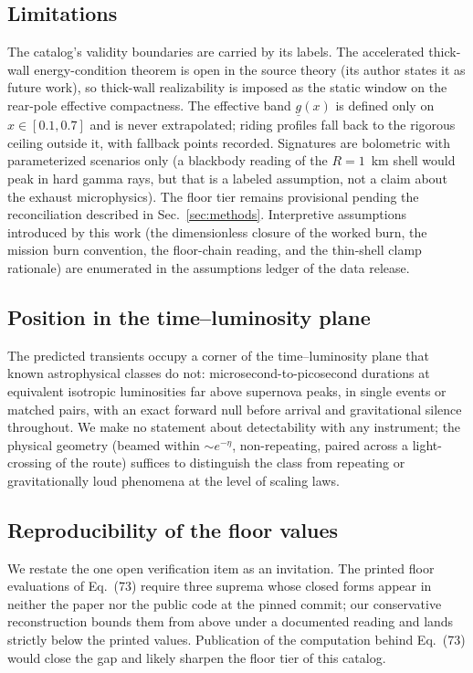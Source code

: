 \documentclass[11pt]{article}
\begin{document}
\subsection{Limitations}

The catalog's validity boundaries are carried by its labels. The
accelerated thick-wall energy-condition theorem is open in the source
theory (its author states it as future work), so thick-wall realizability
is imposed as the static window on the rear-pole effective compactness.
The effective band $\underline{g}(x)$ is defined only on $x \in [0.1,
0.7]$ and is never extrapolated; riding profiles fall back to the rigorous
ceiling outside it, with fallback points recorded. Signatures are
bolometric with parameterized scenarios only (a blackbody reading of the
$R = 1$~km shell would peak in hard gamma rays, but that is a labeled
assumption, not a claim about the exhaust microphysics). The floor tier
remains provisional pending the reconciliation described in
Sec.~\ref{sec:methods}. Interpretive assumptions introduced by this work
(the dimensionless closure of the worked burn, the mission burn
convention, the floor-chain reading, and the thin-shell clamp rationale)
are enumerated in the assumptions ledger of the data release.

\subsection{Position in the time--luminosity plane}

The predicted transients occupy a corner of the time--luminosity plane
that known astrophysical classes do not: microsecond-to-picosecond
durations at equivalent isotropic luminosities far above supernova peaks,
in single events or matched pairs, with an exact forward null before
arrival and gravitational silence throughout. We make no statement about
detectability with any instrument; the physical geometry (beamed within
$\sim e^{-\eta}$, non-repeating, paired across a light-crossing of the
route) suffices to distinguish the class from repeating or
gravitationally loud phenomena at the level of scaling laws.

\subsection{Reproducibility of the floor values}

We restate the one open verification item as an invitation. The printed
floor evaluations of Eq.~(73) require three suprema whose closed forms
appear in neither the paper nor the public code at the pinned commit; our
conservative reconstruction bounds them from above under a documented
reading and lands strictly below the printed values. Publication of the
computation behind Eq.~(73) would close the gap and likely sharpen the
floor tier of this catalog.
\end{document}
